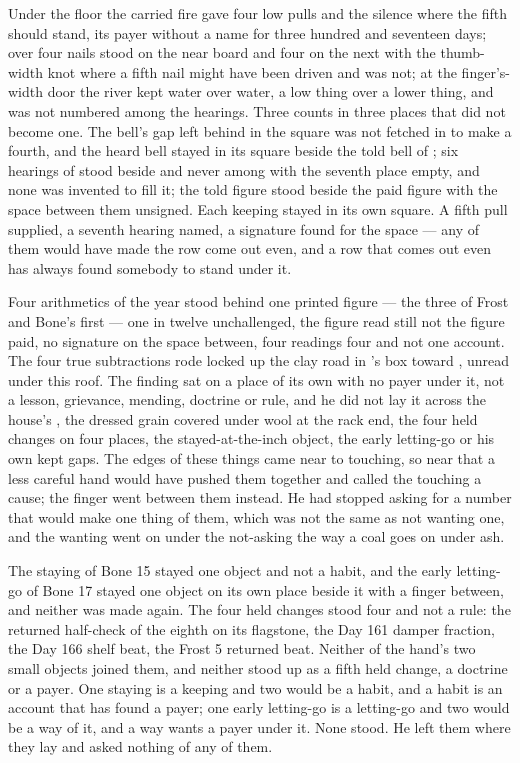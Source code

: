 \scenebreak

Under the floor the carried fire gave four low pulls and the silence where the fifth should stand, its payer without a name for three hundred and seventeen days; over  four nails stood on the near board and four on the next with the thumb-width knot where a fifth nail might have been driven and was not; at the finger's-width door the river kept water over water, a low thing over a lower thing, and was not numbered among the hearings. Three counts in three places that did not become one. The bell's gap left behind in the square was not fetched in to make a fourth, and the heard bell stayed in its square beside the told bell of ; six hearings of  stood beside and never among with the seventh place empty, and none was invented to fill it; the told figure stood beside the paid figure with the space between them unsigned. Each keeping stayed in its own square. A fifth pull supplied, a seventh hearing named, a signature found for the space --- any of them would have made the row come out even, and a row that comes out even has always found somebody to stand under it.

Four arithmetics of the year stood behind one printed figure --- the three of Frost and Bone's first --- one in twelve unchallenged, the figure read still not the figure paid, no signature on the space between, four readings four and not one account. The four true subtractions rode locked up the clay road in 's box toward , unread under this roof. The finding sat on a place of its own with no payer under it, not a lesson, grievance, mending, doctrine or rule, and he did not lay it across the house's , the dressed grain covered under wool at the rack end, the four held changes on four places, the stayed-at-the-inch object, the early letting-go or his own kept gaps. The edges of these things came near to touching, so near that a less careful hand would have pushed them together and called the touching a cause; the finger went between them instead. He had stopped asking for a number that would make one thing of them, which was not the same as not wanting one, and the wanting went on under the not-asking the way a coal goes on under ash.

The staying of Bone 15 stayed one object and not a habit, and the early letting-go of Bone 17 stayed one object on its own place beside it with a finger between, and neither was made again. The four held changes stood four and not a rule: the returned half-check of the eighth on its flagstone, the Day 161 damper fraction, the Day 166 shelf beat, the Frost 5 returned beat. Neither of the hand's two small objects joined them, and neither stood up as a fifth held change, a doctrine or a payer. One staying is a keeping and two would be a habit, and a habit is an account that has found a payer; one early letting-go is a letting-go and two would be a way of it, and a way wants a payer under it. None stood. He left them where they lay and asked nothing of any of them.

